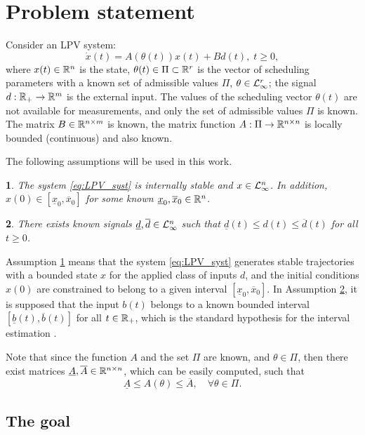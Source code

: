 \documentclass[twocolumn,english]{IEEEtran}
\theoremstyle{plain}
\theoremstyle{definition}
\theoremstyle{plain}
\newtheorem{assumption}{\protect\assumptionname}
\theoremstyle{plain}
\theoremstyle{remark}
\providecommand{\assumptionname}{Assumption}
\begin{document}
\section{\label{sec:Problem-statement} Problem statement}

Consider an LPV system:
\begin{equation}
\dot{x}(t)=A(\theta(t))x(t)+Bd(t),\;t\geq0,\label{eq:LPV_syst}
\end{equation}
where $x(t)\in\mathbb{R}^{n}$ is the state, $\theta(t)\in\Pi\subset\mathbb{R}^{r}$ is the vector of scheduling parameters with a known set of admissible values $\Pi$, $\theta\in\mathcal{L}_{\infty}^{r}$; the signal $d:\mathbb{R}_{+}\to\mathbb{R}^{m}$ is the external input. The values of the scheduling vector $\theta(t)$ are not available for measurements, and only the set of admissible values $\Pi$ is known. The matrix $B\in\mathbb{R}^{n\times m}$ is known, the matrix function $A:\Pi\to\mathbb{R}^{n\times n}$ is locally bounded (continuous) and also known.

The following assumptions will be used in this work.
\begin{assumption}
\label{ass:a1} The system \eqref{eq:LPV_syst} is internally stable and $x\in\mathcal{L}_{\infty}^{n}$. In addition, $x(0)\in[\underline{x}_{0},\overline{x}_{0}]$ for some known $\underline{x}_{0},\overline{x}_{0}\in\mathbb{R}^{n}$.
\end{assumption}

\begin{assumption}
\label{ass:a2} There exists known signals $\underline{d},\overline{d}\in\mathcal{L}_{\infty}^{n}$ such that $\underline{d}(t)\leq d(t)\leq\overline{d}(t)$ for all $t\geq0$.
\end{assumption}
Assumption \ref{ass:a1} means that the system \eqref{eq:LPV_syst} generates stable trajectories with a bounded state $x$ for the applied class of inputs $d$, and the initial conditions $x(0)$ are constrained to belong to a given interval $[\underline{x}_{0},\overline{x}_{0}]$. In Assumption \ref{ass:a2}, it is supposed that the input $b(t)$ belongs to a known bounded interval $[\underline{b}(t),\overline{b}(t)]$ for all $t\in\mathbb{R}_{+}$, which is the standard hypothesis for the interval estimation \cite{Efimov2016,Raiessi2018}.

Note that since the function $A$ and the set $\Pi$ are known, and $\theta\in\Pi$, then there exist matrices $\underline{A},\overline{A}\in\mathbb{R}^{n\times n}$, which can be easily computed, such that 
\[
\underline{A}\leq A(\theta)\leq\overline{A},\quad\forall\theta\in\Pi.
\]

\subsection{The goal}
\end{document}
